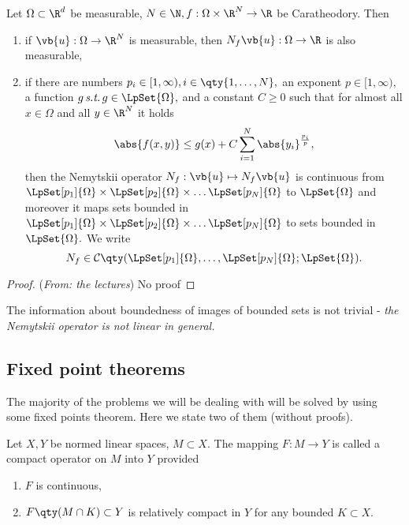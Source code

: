 \begin{theorem}
  Let $\Omega \subset \R^{d}$ be measurable, $N \in \N, f: \Omega \times \R^{N} \to \R$ be Caratheodory. Then

  \begin{enumerate}
	  \item if $\vb{u}: \Omega \to \R^{N}$ is measurable, then $N_f \vb{u}: \Omega \to \R$ is also measurable,
	  \item if there are numbers $p_i \in [1, \infty), i \in \qty{1, \dots, N},$ an exponent $p \in [1, \infty),$ a function $g \, \text{\textit{s.t.}} \, g \in \LpSet{\Omega},$ and a constant $C\geq 0$ such that for almost all $x \in \Omega$ and all $y \in \R^{N}$ it holds
		  \[
			  \abs{f(x,y)}\leq g(x) + C \sum_{i=1}^N\abs{y_i}^{\frac{p_i}{p}},
		  \]
		  then the Nemytskii operator $N_f: \vb{u} \mapsto N_f\vb{u}$ is continuous from $\LpSet[p_1]{\Omega} \times \LpSet[p_2]{\Omega} \times \dots \LpSet[p_N]{\Omega}$ to $\LpSet{\Omega}$ and moreover it maps sets bounded in $\LpSet[p_1]{\Omega} \times \LpSet[p_2]{\Omega} \times \dots \LpSet[p_N]{\Omega}$ to sets bounded in $\LpSet{\Omega}.$ We write
		  \[
			  N_f \in \mathcal{C}\qty(\LpSet[p_1]{\Omega}, \dots, \LpSet[p_N]{\Omega}; \LpSet{\Omega}).
		  \]
  \end{enumerate}
\end{theorem}

\begin{proof}(\textit{From: the lectures})
	No proof
\end{proof}

\begin{remark}
	The information about boundedness of images of bounded sets is not trivial - \textit{the Nemytskii operator is not linear in general.}
\end{remark}

\subsection{Fixed point theorems}
\label{sec:fixed_points}
The majority of the problems we will be dealing with will be solved by using some fixed points theorem. Here we state two of them (without proofs).

\begin{definition}
	Let $X,Y$ be normed linear spaces, $M \subset X.$ The mapping $F:M \to Y$ is called a compact operator on $M$ into $Y$ provided
	\begin{enumerate}
		\item $F$ is continuous,
		\item $F\qty(M \cap K) \subset Y$ is relatively compact in $Y$ for any bounded $K \subset X.$
	\end{enumerate}
\end{definition}

